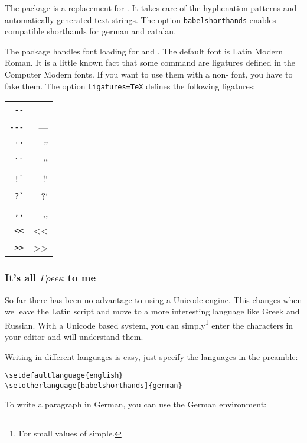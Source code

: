 The package \cite{polyglossia} is a replacement for
. It takes care of the hyphenation patterns and automatically
generated text strings. The option \verb|babelshorthands| enables
 compatible shorthands for german and catalan.

The package \cite{fontspec} handles font loading for
 and . The default font is Latin Modern
Roman. It is a little known fact that some  command are ligatures
defined in the Computer Modern fonts. If you want to use them with a
non- font, you have to fake them. The option
\texttt{Ligatures=TeX} defines the following ligatures:

\begin{tabular}{rr}
\verb|--|	& --\\
\verb|---|	& ---\\
\verb|''|	& ''\\
\verb|``|	& ``\\
\verb|!`|	& !`\\
\verb|?`|	& ?`\\
\verb|,,|	& ,,\\
\verb|<<|	& <<\\
\verb|>>|	& >>\\
\end{tabular}

\subsubsection{It's all $\Gamma\rho\epsilon\epsilon\kappa$ to me}

So far there has been no advantage to using a Unicode  engine.
This changes when we leave the Latin script and move to a more interesting
language like Greek and Russian.  With a Unicode based system, you can
simply\footnote{For small values of simple.} enter the characters in your
editor and  will understand them.

Writing in different languages is easy, just specify the languages in the preamble:

\begin{lscommand}
\verb|\setdefaultlanguage{english}|\\
\verb|\setotherlanguage[babelshorthands]{german}|
\end{lscommand}
%
To write a paragraph in German, you can use the German environment:

